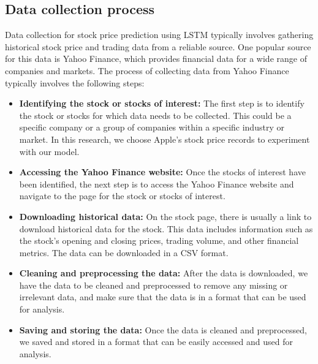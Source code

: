 \documentclass[a4paper]{article}
\begin{document}
\subsection{Data collection process}
Data collection for stock price prediction using LSTM typically involves gathering historical stock price and trading data from a reliable source. One popular source for this data is Yahoo Finance, which provides financial data for a wide range of companies and markets. The process of collecting data from Yahoo Finance typically involves the following steps:
\begin{itemize}[leftmargin=7.5pt]
    \item \textbf{Identifying the stock or stocks of interest:} The first step is to identify the stock or stocks for which data needs to be collected. This could be a specific company or a group of companies within a specific industry or market. In this research, we choose Apple's stock price records to experiment with our model.
    \item \textbf{Accessing the Yahoo Finance website:} Once the stocks of interest have been identified, the next step is to access the Yahoo Finance website and navigate to the page for the stock or stocks of interest.
    \item \textbf{Downloading historical data:} On the stock page, there is usually a link to download historical data for the stock. This data includes information such as the stock's opening and closing prices, trading volume, and other financial metrics. The data can be downloaded in a CSV format.
    \item \textbf{Cleaning and preprocessing the data:} After the data is downloaded, we have the data to be cleaned and preprocessed to remove any missing or irrelevant data, and make sure that the data is in a format that can be used for analysis.
    \item \textbf{Saving and storing the data:} Once the data is cleaned and preprocessed, we saved and stored in a format that can be easily accessed and used for analysis.
\end{itemize}
\end{document}
